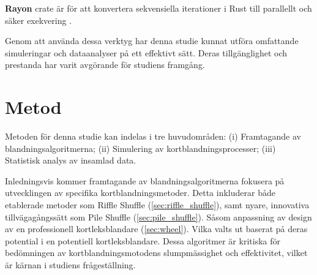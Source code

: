 \documentclass[swedish,a4paper]{article}
\begin{document}
\textbf{Rayon} \gls{crate}  är för att konvertera sekvensiella 
iterationer i Rust till parallellt och säker exekvering 
\parencite{rayon_crate}.

Genom att använda dessa verktyg har denna studie kunnat utföra omfattande
simuleringar och dataanalyser på ett effektivt sätt. Deras tillgänglighet och
prestanda har varit avgörande för studiens framgång.




\section{Metod} 
Metoden för denna studie kan indelas i tre huvudområden:
(i) Framtagande av  blandningsalgoritmerna;
(ii) Simulering av kortblandningsprocesser;
(iii) Statistisk analys av insamlad data.

Inledningsvis kommer framtagande av blandningsalgoritmerna fokusera på
utvecklingen av specifika kortblandningsmetoder. Detta inkluderar både
etablerade metoder som Riffle Shuffle (\ref{sec:riffle_shuffle}), samt nyare,
innovativa tillvägagångssätt som Pile Shuffle (\ref{sec:pile_shuffle}). Såsom
anpassning av design av en professionell kortleksblandare (\ref{sec:wheel}).
Vilka valts ut baserat på deras potential i en potentiell kortleksblandare.
Dessa algoritmer är kritiska för bedömningen av kortblandningsmotodens
slumpmässighet och effektivitet, vilket är kärnan i studiens frågeställning. 
\end{document}

